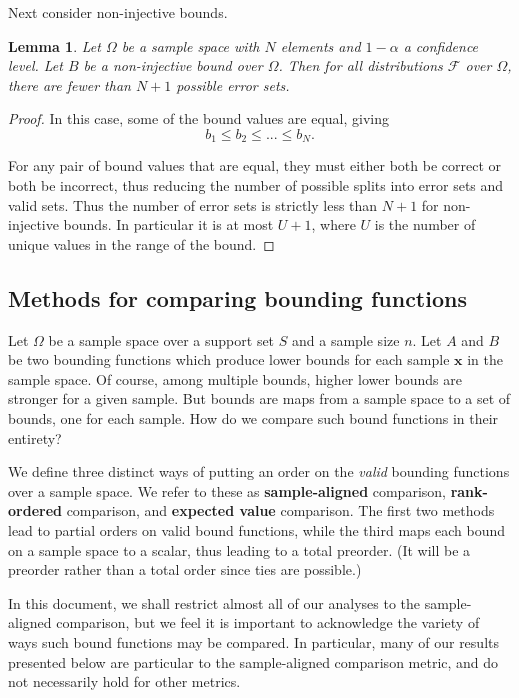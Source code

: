 \documentclass{article}
\newtheorem{lemma}[theorem]{Lemma}
\theoremstyle{definition}
\theoremstyle{remark}
\def\x{\mathbf{x}}
\begin{document}
Next consider non-injective bounds. 
\begin{lemma}
Let $\Omega$ be a sample space with $N$ elements and $1-\alpha$ a confidence level. 
Let $B$ be a non-injective bound over $\Omega$. Then for all distributions $\mathcal{F}$ over $\Omega$, there are fewer than $N+1$ possible error sets.
\end{lemma}
\begin{proof}
    In this case, some of the bound values are equal, giving 
$$
b_1\leq b_2 \leq ... \leq b_N.$$

For any pair of bound values that are equal, they must either both be correct or both be incorrect, thus reducing the number of possible splits into error sets and valid sets. Thus the number of error sets is strictly less than $N+1$ for non-injective bounds. In particular it is at most $U+1$, where $U$ is the number of unique values in the range of the bound.
\end{proof}

\subsection{Methods for comparing bounding functions}
Let $\Omega$ be a sample space over a support set $S$ and a sample size $n$.  Let $A$ and $B$ be two bounding functions which produce lower bounds for each sample $\x$ in the sample space. Of course, among multiple bounds, higher lower bounds are stronger for a given sample. But bounds are maps from a sample space to a set of bounds, one for each sample. How do we compare such bound functions in their entirety?

 We define three distinct ways of putting an order on the \textit{valid} bounding functions over a sample space. We refer to these as {\bf sample-aligned} comparison, {\bf rank-ordered} comparison, and \textbf{expected value} comparison. The first two methods lead to partial orders on valid bound functions, while the third maps each bound on a sample space to a scalar, thus leading to a total preorder. (It will be a preorder rather than a total order since ties are possible.)

 In this document, we shall restrict almost all of our analyses to the sample-aligned comparison, but we feel it is important to acknowledge the variety of ways such bound functions may be compared. In particular, many of our results presented below are particular to the sample-aligned comparison metric, and do not necessarily hold for other metrics.
\end{document}
